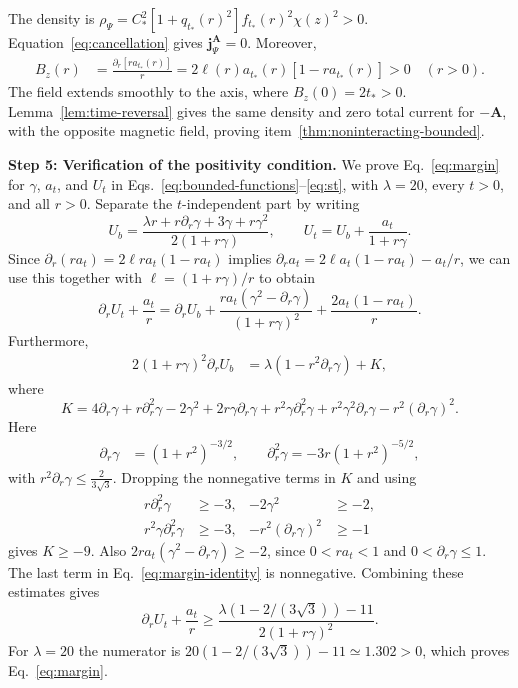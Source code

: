 \documentclass[11pt,a4paper]{article}
\theoremstyle{remark}
\theoremstyle{plain}
\newcommand{\jj}{\mathbf j}
\newcommand{\A}{\mathbf A}
\begin{document}
The density is
$\rho_\Psi=C_*^2[1+q_{t_*}(r)^2]f_{t_*}(r)^2\chi(z)^2>0$.
Equation~\eqref{eq:cancellation} gives $\jj_\Psi^\A=0$. Moreover,
\begin{align*}
 B_z(r)&=\frac{\partial_r[ra_{t_*}(r)]}r=2\ell(r)a_{t_*}(r)[1-ra_{t_*}(r)]>0\quad(r>0).
\end{align*}
The field extends smoothly to the axis, where $B_z(0)=2t_*>0$.
Lemma~\ref{lem:time-reversal} gives the same density and zero total
current for $-\A$, with the opposite magnetic field, proving item~\ref{thm:noninteracting-bounded}.

\noindent\textbf{Step 5: Verification of the positivity condition.}
We prove Eq.~\eqref{eq:margin} for $\gamma$, $a_t$, and $U_t$ in
Eqs.~\eqref{eq:bounded-functions}--\eqref{eq:st}, with
$\lambda=20$, every $t>0$, and all $r>0$.
Separate the $t$-independent part by writing
\begin{equation*}
 U_b=\frac{\lambda r+r\partial_r\gamma+3\gamma+r\gamma^2}{2(1+r\gamma)},\qquad
 U_t=U_b+\frac{a_t}{1+r\gamma}.
\end{equation*}
Since $\partial_r(ra_t)=2\ell ra_t(1-ra_t)$ implies 
$\partial_r a_t = 2\ell a_t(1-ra_t) - a_t/r$, we can use 
this together with $\ell = (1+r\gamma)/r$ to obtain 
\begin{equation}
 \partial_rU_t+\frac{a_t}r=\partial_rU_b
 +\frac{ra_t(\gamma^2-\partial_r\gamma)}{(1+r\gamma)^2}
 +\frac{2a_t(1-ra_t)}{r}.
 \label{eq:margin-identity}
\end{equation}
Furthermore,
\begin{align*}
 2(1+r\gamma)^2\partial_rU_b&=\lambda(1-r^2\partial_r\gamma)+K,
\end{align*}
where
\begin{equation*}
K=4\partial_r\gamma+r\partial_r^2\gamma-2\gamma^2+2r\gamma\partial_r\gamma+r^2\gamma\partial_r^2\gamma+r^2\gamma^2\partial_r\gamma-r^2(\partial_r\gamma)^2.
\end{equation*}
Here
\begin{align*}
 \partial_r\gamma&=(1+r^2)^{-3/2},\qquad \partial_r^2\gamma=-3r(1+r^2)^{-5/2},
\end{align*}
with $r^2\partial_r\gamma\le\frac{2}{3\sqrt3}$.
Dropping the nonnegative terms in $K$ and using
\begin{equation*}
 \begin{aligned}
 r\partial_r^2\gamma&\ge-3,& -2\gamma^2&\ge-2,\\
 r^2\gamma\partial_r^2\gamma&\ge-3,& -r^2(\partial_r\gamma)^2&\ge-1
 \end{aligned}
\end{equation*}
gives $K\ge-9$. Also
$2ra_t(\gamma^2-\partial_r\gamma)\ge-2$, since $0<ra_t<1$ and $0<\partial_r\gamma\le1$.
The last term in Eq.~\eqref{eq:margin-identity} is nonnegative.
Combining these estimates gives
\begin{equation*}
 \partial_rU_t+\frac{a_t}r\ge
 \frac{\lambda(1-2/(3\sqrt3))-11}{2(1+r\gamma)^2}.
\end{equation*}
For $\lambda=20$ the numerator is
$20(1-2/(3\sqrt3))-11\simeq1.302>0$, which proves
Eq.~\eqref{eq:margin}.
\end{document}
